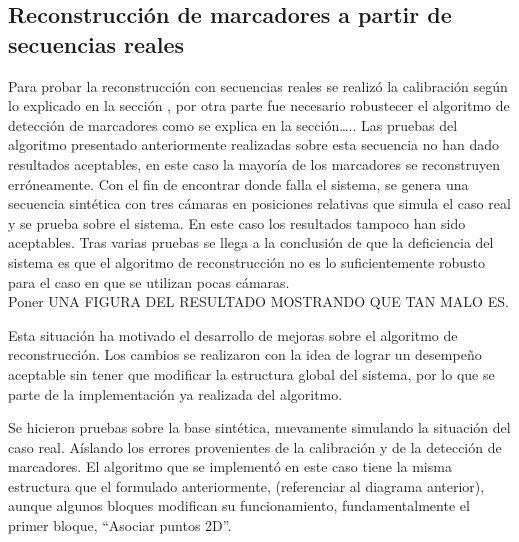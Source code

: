 \subsection{Reconstrucción de marcadores a partir de secuencias reales}

Para probar la reconstrucción con secuencias reales se realizó la calibración según lo explicado en la sección , por otra parte fue necesario robustecer el algoritmo de detección de marcadores como se explica en la sección….. Las pruebas del algoritmo presentado anteriormente realizadas sobre esta secuencia no han dado resultados aceptables, en este caso la mayoría de los marcadores se reconstruyen erróneamente. Con el fin de encontrar donde falla el sistema, se genera una secuencia sintética con tres cámaras en posiciones relativas que simula el caso real y se prueba sobre el sistema.  En este caso los resultados tampoco han sido aceptables. Tras varias pruebas se llega  a la conclusión de que la deficiencia del sistema es que el algoritmo de reconstrucción no es lo suficientemente robusto para el caso en que se utilizan pocas cámaras.\\

Poner UNA FIGURA DEL RESULTADO MOSTRANDO QUE TAN MALO ES.

Esta situación ha motivado el desarrollo de mejoras sobre el algoritmo de reconstrucción. Los cambios se realizaron con la idea de lograr un desempeño aceptable sin tener que modificar la estructura global del sistema, por lo que se parte de la implementación ya realizada del algoritmo.

Se hicieron pruebas sobre la base sintética, nuevamente simulando la situación del caso real. Aíslando los errores provenientes de la calibración y de la detección de marcadores.
El algoritmo que se implementó en este caso tiene la misma estructura que el formulado anteriormente, (referenciar al diagrama anterior), aunque algunos bloques modifican su funcionamiento, fundamentalmente el primer bloque,   “Asociar puntos 2D”.


